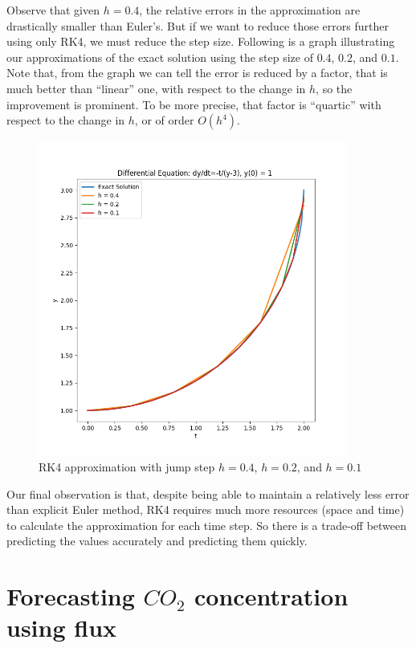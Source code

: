 \documentclass[a4paper]{article}
\numberwithin{equation}{section}
\begin{document}
Observe that given \(h = 0.4\), the relative errors in the approximation are drastically smaller than Euler's. But if we want to reduce those errors further using only RK4, we must reduce the step size. Following is a graph illustrating our approximations of the exact solution using the step size of \(0.4\), \(0.2\), and \(0.1\). Note that, from the graph we can tell the error is reduced by a factor, that is much better than ``linear'' one, with respect to the change in \(h\), so the improvement is prominent. To be more precise, that factor is ``quartic'' with respect to the change in \(h\), or of order \(O(h^4)\).

\begin{figure}[H]
  \centering
  \includegraphics[width=0.9\textwidth]{plot_runge_kutta.png}
  \caption{RK4 approximation with jump step \(h = 0.4\), \(h = 0.2\), and \(h = 0.1\)}
\end{figure}

Our final observation is that, despite being able to maintain a relatively less error than explicit Euler method, RK4 requires much more resources (space and time) to calculate the approximation for each time step. So there is a trade-off between predicting the values accurately and predicting them quickly.

\newpage
\section{Forecasting \texorpdfstring{\(CO_2\)}{} concentration using flux}
\end{document}
